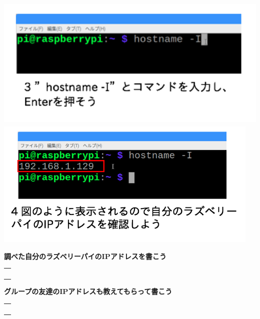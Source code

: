 \documentclass[a4paper,12pt,dvipdfmx]{jarticle}
\begin{document}
\includegraphics[width=13.799cm,height=6.456cm]{ome7-img010.png}
\centering
\includegraphics[width=12.771cm,height=6.128cm]{ome7-img009.png}
\flushleft


\bigskip


\bigskip


\bigskip


\bigskip


\bigskip

{\bfseries
調べた自分のラズベリーパイのIPアドレスを書こう}

\bigskip


\centering
\begin{tabular}{|p{}|} \hline
	\\
	\\
	\\
	\\ \hline
\end{tabular}


\bigskip


\bigskip

\flushleft

{\bfseries
グループの友達のIPアドレスも教えてもらって書こう}

\bigskip


\centering
\begin{tabular}{|p{}|} \hline
	\\
	\\
	\\
	\\ \hline
\end{tabular}
\end{document}
